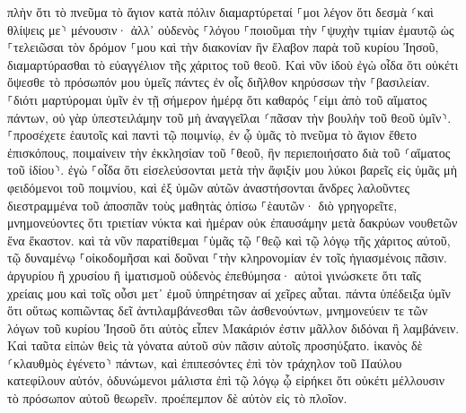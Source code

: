 \documentclass[twoside, 9pt]{extreport}
\begin{document}
πλὴν ὅτι τὸ πνεῦμα τὸ ἅγιον κατὰ πόλιν διαμαρτύρεταί ⸀μοι λέγον ὅτι δεσμὰ ⸂καὶ θλίψεις με⸃ μένουσιν· 
ἀλλ᾽ οὐδενὸς ⸀λόγου ⸀ποιοῦμαι τὴν ⸀ψυχὴν τιμίαν ἐμαυτῷ ὡς ⸀τελειῶσαι τὸν δρόμον ⸀μου καὶ τὴν διακονίαν ἣν ἔλαβον παρὰ τοῦ κυρίου Ἰησοῦ, διαμαρτύρασθαι τὸ εὐαγγέλιον τῆς χάριτος τοῦ θεοῦ. 
Καὶ νῦν ἰδοὺ ἐγὼ οἶδα ὅτι οὐκέτι ὄψεσθε τὸ πρόσωπόν μου ὑμεῖς πάντες ἐν οἷς διῆλθον κηρύσσων τὴν ⸀βασιλείαν. 
⸀διότι μαρτύρομαι ὑμῖν ἐν τῇ σήμερον ἡμέρᾳ ὅτι καθαρός ⸀εἰμι ἀπὸ τοῦ αἵματος πάντων, 
οὐ γὰρ ὑπεστειλάμην τοῦ μὴ ἀναγγεῖλαι ⸂πᾶσαν τὴν βουλὴν τοῦ θεοῦ ὑμῖν⸃. 
⸀προσέχετε ἑαυτοῖς καὶ παντὶ τῷ ποιμνίῳ, ἐν ᾧ ὑμᾶς τὸ πνεῦμα τὸ ἅγιον ἔθετο ἐπισκόπους, ποιμαίνειν τὴν ἐκκλησίαν τοῦ ⸀θεοῦ, ἣν περιεποιήσατο διὰ τοῦ ⸂αἵματος τοῦ ἰδίου⸃. 
ἐγὼ ⸀οἶδα ὅτι εἰσελεύσονται μετὰ τὴν ἄφιξίν μου λύκοι βαρεῖς εἰς ὑμᾶς μὴ φειδόμενοι τοῦ ποιμνίου, 
καὶ ἐξ ὑμῶν αὐτῶν ἀναστήσονται ἄνδρες λαλοῦντες διεστραμμένα τοῦ ἀποσπᾶν τοὺς μαθητὰς ὀπίσω ⸀ἑαυτῶν· 
διὸ γρηγορεῖτε, μνημονεύοντες ὅτι τριετίαν νύκτα καὶ ἡμέραν οὐκ ἐπαυσάμην μετὰ δακρύων νουθετῶν ἕνα ἕκαστον. 
καὶ τὰ νῦν παρατίθεμαι ⸀ὑμᾶς τῷ ⸀θεῷ καὶ τῷ λόγῳ τῆς χάριτος αὐτοῦ, τῷ δυναμένῳ ⸀οἰκοδομῆσαι καὶ δοῦναι ⸀τὴν κληρονομίαν ἐν τοῖς ἡγιασμένοις πᾶσιν. 
ἀργυρίου ἢ χρυσίου ἢ ἱματισμοῦ οὐδενὸς ἐπεθύμησα· 
αὐτοὶ γινώσκετε ὅτι ταῖς χρείαις μου καὶ τοῖς οὖσι μετ᾽ ἐμοῦ ὑπηρέτησαν αἱ χεῖρες αὗται. 
πάντα ὑπέδειξα ὑμῖν ὅτι οὕτως κοπιῶντας δεῖ ἀντιλαμβάνεσθαι τῶν ἀσθενούντων, μνημονεύειν τε τῶν λόγων τοῦ κυρίου Ἰησοῦ ὅτι αὐτὸς εἶπεν Μακάριόν ἐστιν μᾶλλον διδόναι ἢ λαμβάνειν. 
Καὶ ταῦτα εἰπὼν θεὶς τὰ γόνατα αὐτοῦ σὺν πᾶσιν αὐτοῖς προσηύξατο. 
ἱκανὸς δὲ ⸂κλαυθμὸς ἐγένετο⸃ πάντων, καὶ ἐπιπεσόντες ἐπὶ τὸν τράχηλον τοῦ Παύλου κατεφίλουν αὐτόν, 
ὀδυνώμενοι μάλιστα ἐπὶ τῷ λόγῳ ᾧ εἰρήκει ὅτι οὐκέτι μέλλουσιν τὸ πρόσωπον αὐτοῦ θεωρεῖν. προέπεμπον δὲ αὐτὸν εἰς τὸ πλοῖον. 
\end{document}

